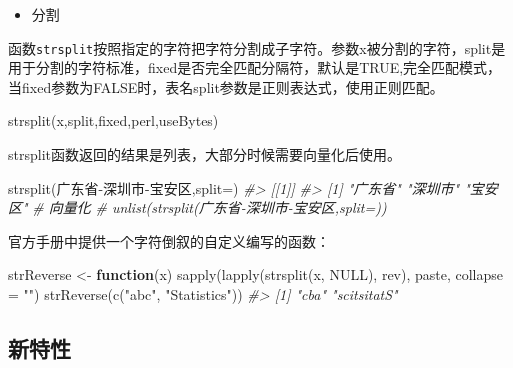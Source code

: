 \documentclass[
]{book}
\newenvironment{Shaded}{\begin{snugshade}}{\end{snugshade}}
\newcommand{\AttributeTok}[1]{\textcolor[rgb]{0.77,0.63,0.00}{#1}}
\newcommand{\CommentTok}[1]{\textcolor[rgb]{0.56,0.35,0.01}{\textit{#1}}}
\newcommand{\ConstantTok}[1]{\textcolor[rgb]{0.00,0.00,0.00}{#1}}
\newcommand{\ControlFlowTok}[1]{\textcolor[rgb]{0.13,0.29,0.53}{\textbf{#1}}}
\newcommand{\FunctionTok}[1]{\textcolor[rgb]{0.00,0.00,0.00}{#1}}
\newcommand{\NormalTok}[1]{#1}
\newcommand{\OtherTok}[1]{\textcolor[rgb]{0.56,0.35,0.01}{#1}}
\newcommand{\StringTok}[1]{\textcolor[rgb]{0.31,0.60,0.02}{#1}}
\providecommand{\tightlist}{%
  \setlength{\itemsep}{0pt}\setlength{\parskip}{0pt}}
\begin{document}
\begin{itemize}
\tightlist
\item
  分割
\end{itemize}

函数\texttt{strsplit}按照指定的字符把字符分割成子字符。参数x被分割的字符，split是用于分割的字符标准，fixed是否完全匹配分隔符，默认是TRUE,完全匹配模式，当fixed参数为FALSE时，表名split参数是正则表达式，使用正则匹配。

\begin{Shaded}
\begin{Highlighting}[]
\FunctionTok{strsplit}\NormalTok{(x,split,fixed,perl,useBytes)}
\end{Highlighting}
\end{Shaded}

strsplit函数返回的结果是列表，大部分时候需要向量化后使用。

\begin{Shaded}
\begin{Highlighting}[]
\FunctionTok{strsplit}\NormalTok{(}\StringTok{\textquotesingle{}广东省{-}深圳市{-}宝安区\textquotesingle{}}\NormalTok{,}\AttributeTok{split=}\StringTok{\textquotesingle{}{-}\textquotesingle{}}\NormalTok{)}
\CommentTok{\#\textgreater{} [[1]]}
\CommentTok{\#\textgreater{} [1] "广东省" "深圳市" "宝安区"}
\CommentTok{\# 向量化}
\CommentTok{\# unlist(strsplit(\textquotesingle{}广东省{-}深圳市{-}宝安区\textquotesingle{},split=\textquotesingle{}{-}\textquotesingle{}))}
\end{Highlighting}
\end{Shaded}

官方手册中提供一个字符倒叙的自定义编写的函数：

\begin{Shaded}
\begin{Highlighting}[]
\NormalTok{strReverse }\OtherTok{\textless{}{-}} \ControlFlowTok{function}\NormalTok{(x) }\FunctionTok{sapply}\NormalTok{(}\FunctionTok{lapply}\NormalTok{(}\FunctionTok{strsplit}\NormalTok{(x, }\ConstantTok{NULL}\NormalTok{), rev), paste, }\AttributeTok{collapse =} \StringTok{""}\NormalTok{)}
\FunctionTok{strReverse}\NormalTok{(}\FunctionTok{c}\NormalTok{(}\StringTok{"abc"}\NormalTok{, }\StringTok{"Statistics"}\NormalTok{))}
\CommentTok{\#\textgreater{} [1] "cba"        "scitsitatS"}
\end{Highlighting}
\end{Shaded}

\hypertarget{newfeatures}{%
\subsection{新特性}\label{newfeatures}}
\end{document}
